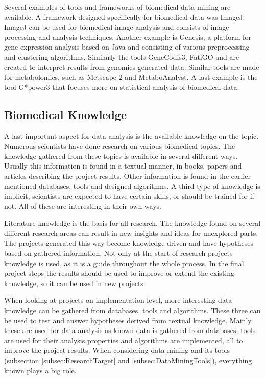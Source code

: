 \documentclass[10pt,a4paper]{article}
\begin{document}
	Several examples of tools and frameworks of biomedical data mining are available. A framework designed specifically for biomedical data was ImageJ\cite{schindelin2015imagej}. ImageJ can be used for biomedical image analysis and consists of image processing and analysis techniques. Another example is Genesis\cite{sturn2002genesis}, a platform for gene expression analysis based on Java and consisting of various preprocessing and clustering algorithms. Similarly the tools GeneCodis3\cite{tabas2012genecodis3}, FatiGO\cite{al2004fatigo} and \cite{zeeberg2003gominer} are created to interpret results from genomics generated data. Similar tools are made for metabolomics, such as Metscape 2\cite{karnovsky2011metscape} and MetaboAnalyst\cite{xia2015metaboanalyst}. A last example is the tool G*power3\cite{faul2007g} that focuses more on statistical analysis of biomedical data.
		
	\subsection{Biomedical Knowledge}
	
	A last important aspect for data analysis is the available knowledge on the topic. Numerous scientists have done research on various biomedical topics. The knowledge gathered from these topics is available in several different ways\cite{bellazzi2011data}. Usually this information is found in a textual manner, in books, papers and articles describing the project results. Other information is found in the earlier mentioned databases, tools and designed algorithms. A third type of knowledge is implicit, scientists are expected to have certain skills, or should be trained for if not\cite{zupan2006knowledge}. All of these are interesting in their own ways.
	
	Literature knowledge is the basis for all research. The knowledge found on several different research areas can result in new insights and ideas for unexplored parts. The projects generated this way become knowledge-driven and have hypotheses based on gathered information\cite{bellazzi2011data}. Not only at the start of research projects knowledge is used, as it is a guide throughout the whole process. In the final project steps the results should be used to improve or extend the existing knowledge, so it can be used in new projects\cite{zupan2006knowledge}.
	
	When looking at projects on implementation level, more interesting data knowledge can be gathered from databases, tools and algorithms. These three can be used to test and answer hypotheses derived from textual knowledge. Mainly these are used for data analysis as known data is gathered from databases, tools are used for their analysis properties and algorithms are implemented, all to improve the project results. When considering data mining and its tools (subsection \ref{subsec:ResearchTarget} and \ref{subsec:DataMiningTools}), everything known plays a big role\cite{bellazzi2011data}.
	
\end{document}
